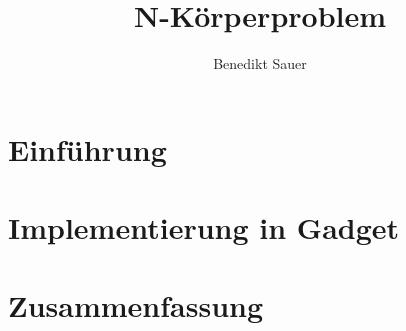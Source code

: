 \documentclass{scrartcl}
\author{Benedikt Sauer}
\title{N-Körperproblem}
\begin{document}
\maketitle
\section{Einführung}

\section{Implementierung in Gadget}

\section{Zusammenfassung}

\end{document}
